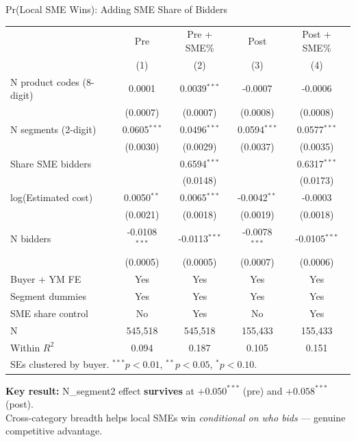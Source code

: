\documentclass[9pt,aspectratio=169]{beamer}
\begin{document}
\begin{frame}{Pr(Local SME Wins): Adding SME Share of Bidders}
\centering\small
\begin{tabular}{lcccc}
\toprule
 & Pre & Pre + SME\% & Post & Post + SME\% \\
 & (1) & (2) & (3) & (4) \\
\midrule
N product codes (8-digit) & 0.0001 & 0.0039$^{***}$ & -0.0007 & -0.0006 \\
 & (0.0007) & (0.0007) & (0.0008) & (0.0008) \\[2pt]
N segments (2-digit) & 0.0605$^{***}$ & 0.0496$^{***}$ & 0.0594$^{***}$ & 0.0577$^{***}$ \\
 & (0.0030) & (0.0029) & (0.0037) & (0.0035) \\[2pt]
Share SME bidders &  & 0.6594$^{***}$ &  & 0.6317$^{***}$ \\
 &  & (0.0148) &  & (0.0173) \\[2pt]
log(Estimated cost) & 0.0050$^{**}$ & 0.0065$^{***}$ & -0.0042$^{**}$ & -0.0003 \\
 & (0.0021) & (0.0018) & (0.0019) & (0.0018) \\[2pt]
N bidders & -0.0108$^{***}$ & -0.0113$^{***}$ & -0.0078$^{***}$ & -0.0105$^{***}$ \\
 & (0.0005) & (0.0005) & (0.0007) & (0.0006) \\[2pt]
\midrule
Buyer + YM FE & Yes & Yes & Yes & Yes \\
Segment dummies & Yes & Yes & Yes & Yes \\
SME share control & No & Yes & No & Yes \\
N & 545,518 & 545,518 & 155,433 & 155,433 \\
Within $R^2$ & 0.094 & 0.187 & 0.105 & 0.151 \\
\bottomrule
\multicolumn{5}{l}{\footnotesize SEs clustered by buyer. $^{***}p<0.01$, $^{**}p<0.05$, $^{*}p<0.10$.} \\
\end{tabular}

\medskip
\small\textbf{Key result:} N\_segment2 effect \textbf{survives} at $+0.050^{***}$ (pre) and $+0.058^{***}$ (post). \\
Cross-category breadth helps local SMEs win \textit{conditional on who bids} --- genuine competitive advantage.
\end{frame}
\end{document}
